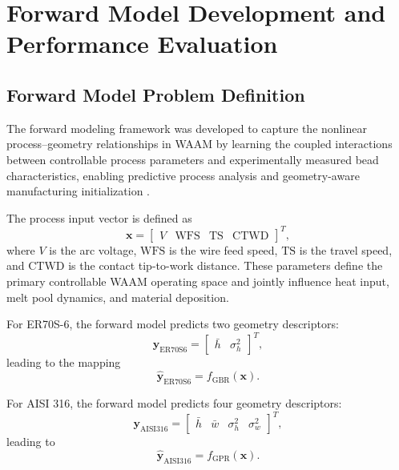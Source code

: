 \documentclass[11pt]{article}
\begin{document}
\section{Forward Model Development and Performance Evaluation}


\subsection{Forward Model Problem Definition}

The forward modeling framework was developed to capture the nonlinear process--geometry relationships in WAAM by learning the coupled interactions between controllable process parameters and experimentally measured bead characteristics, enabling predictive process analysis and geometry-aware manufacturing initialization \cite{Meng2020,Guo2021MLAM}.

The process input vector is defined as
\begin{equation}
\mathbf{x} =
\begin{bmatrix}
V & \mathrm{WFS} & \mathrm{TS} & \mathrm{CTWD}
\end{bmatrix}^{T},
\end{equation}
where $V$ is the arc voltage, $\mathrm{WFS}$ is the wire feed speed, $\mathrm{TS}$ is the travel speed, and $\mathrm{CTWD}$ is the contact tip-to-work distance. These parameters define the primary controllable WAAM operating space and jointly influence heat input, melt pool dynamics, and material deposition.

For ER70S-6, the forward model predicts two geometry descriptors:
\begin{equation}
\mathbf{y}_{\mathrm{ER70S6}} =
\begin{bmatrix}
\bar{h} & \sigma_h^2
\end{bmatrix}^{T},
\end{equation}
leading to the mapping
\begin{equation}
\hat{\mathbf{y}}_{\mathrm{ER70S6}} =
f_{\mathrm{GBR}}(\mathbf{x}).
\end{equation}

For AISI 316, the forward model predicts four geometry descriptors:
\begin{equation}
\mathbf{y}_{\mathrm{AISI316}} =
\begin{bmatrix}
\bar{h} & \bar{w} & \sigma_h^2 & \sigma_w^2
\end{bmatrix}^{T},
\end{equation}
leading to
\begin{equation}
\hat{\mathbf{y}}_{\mathrm{AISI316}} =
f_{\mathrm{GPR}}(\mathbf{x}).
\end{equation}
\end{document}
